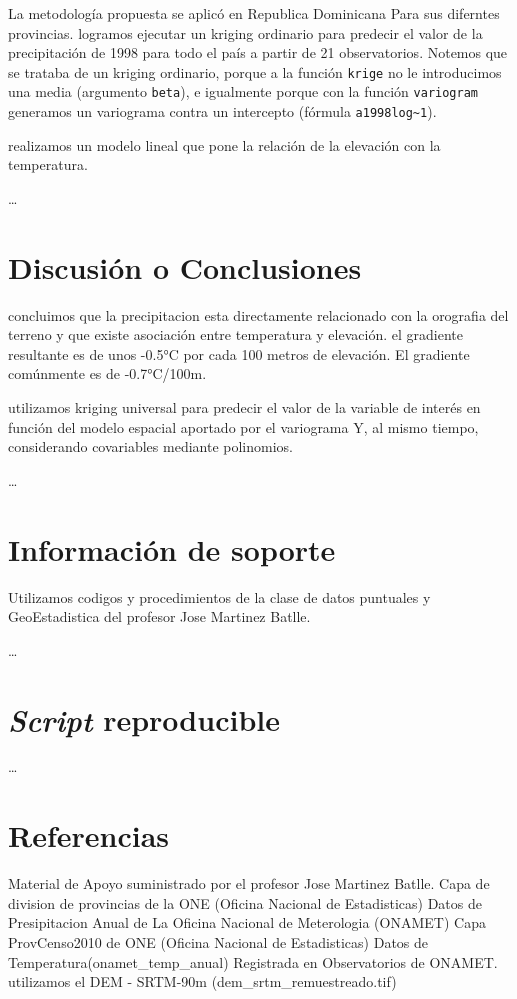 \documentclass[11pt,]{article}
\begin{document}
La metodología propuesta se aplicó en Republica Dominicana Para sus
diferntes provincias. logramos ejecutar un kriging ordinario para
predecir el valor de la precipitación de 1998 para todo el país a partir
de 21 observatorios. Notemos que se trataba de un kriging ordinario,
porque a la función \texttt{krige} no le introducimos una media
(argumento \texttt{beta}), e igualmente porque con la función
\texttt{variogram} generamos un variograma contra un intercepto (fórmula
\texttt{a1998log\textasciitilde{}1}).

realizamos un modelo lineal que pone la relación de la elevación con la
temperatura.

\ldots

\section{Discusión o Conclusiones}\label{discusiuxf3n-o-conclusiones}

concluimos que la precipitacion esta directamente relacionado con la
orografia del terreno y que existe asociación entre temperatura y
elevación. el gradiente resultante es de unos -0.5°C por cada 100 metros
de elevación. El gradiente comúnmente es de -0.7°C/100m.

utilizamos kriging universal para predecir el valor de la variable de
interés en función del modelo espacial aportado por el variograma Y, al
mismo tiempo, considerando covariables mediante polinomios.

\ldots

\section{Información de soporte}\label{informaciuxf3n-de-soporte}

Utilizamos codigos y procedimientos de la clase de datos puntuales y
GeoEstadistica del profesor Jose Martinez Batlle.

\ldots

\section{\texorpdfstring{\emph{Script}
reproducible}{Script reproducible}}\label{script-reproducible}

\ldots

\section{Referencias}\label{referencias}

Material de Apoyo suministrado por el profesor Jose Martinez Batlle.
Capa de division de provincias de la ONE (Oficina Nacional de
Estadisticas) Datos de Presipitacion Anual de La Oficina Nacional de
Meterologia (ONAMET) Capa ProvCenso2010 de ONE (Oficina Nacional de
Estadisticas) Datos de Temperatura(onamet\_temp\_anual) Registrada en
Observatorios de ONAMET. utilizamos el DEM - SRTM-90m
(dem\_srtm\_remuestreado.tif)




\newpage
\singlespacing 
\end{document}
